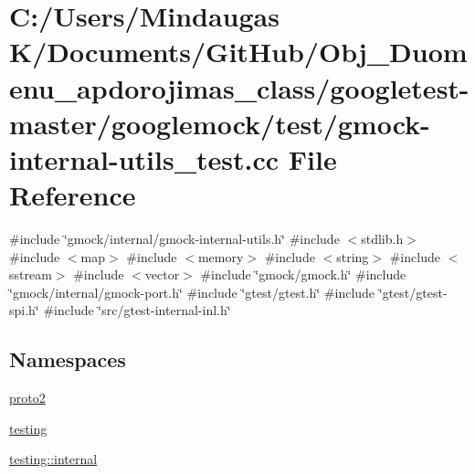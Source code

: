 \hypertarget{googletest-master_2googlemock_2test_2gmock-internal-utils__test_8cc}{}\section{C\+:/\+Users/\+Mindaugas K/\+Documents/\+Git\+Hub/\+Obj\+\_\+\+Duomenu\+\_\+apdorojimas\+\_\+class/googletest-\/master/googlemock/test/gmock-\/internal-\/utils\+\_\+test.cc File Reference}
\label{googletest-master_2googlemock_2test_2gmock-internal-utils__test_8cc}
{\ttfamily \#include \char`\"{}gmock/internal/gmock-\/internal-\/utils.\+h\char`\"{}}\newline
{\ttfamily \#include $<$stdlib.\+h$>$}\newline
{\ttfamily \#include $<$map$>$}\newline
{\ttfamily \#include $<$memory$>$}\newline
{\ttfamily \#include $<$string$>$}\newline
{\ttfamily \#include $<$sstream$>$}\newline
{\ttfamily \#include $<$vector$>$}\newline
{\ttfamily \#include \char`\"{}gmock/gmock.\+h\char`\"{}}\newline
{\ttfamily \#include \char`\"{}gmock/internal/gmock-\/port.\+h\char`\"{}}\newline
{\ttfamily \#include \char`\"{}gtest/gtest.\+h\char`\"{}}\newline
{\ttfamily \#include \char`\"{}gtest/gtest-\/spi.\+h\char`\"{}}\newline
{\ttfamily \#include \char`\"{}src/gtest-\/internal-\/inl.\+h\char`\"{}}\newline
\subsection*{Namespaces}
\begin{DoxyCompactItemize}
\item 
 \mbox{\hyperlink{namespaceproto2}{proto2}}
\item 
 \mbox{\hyperlink{namespacetesting}{testing}}
\item 
 \mbox{\hyperlink{namespacetesting_1_1internal}{testing\+::internal}}
\end{DoxyCompactItemize}
